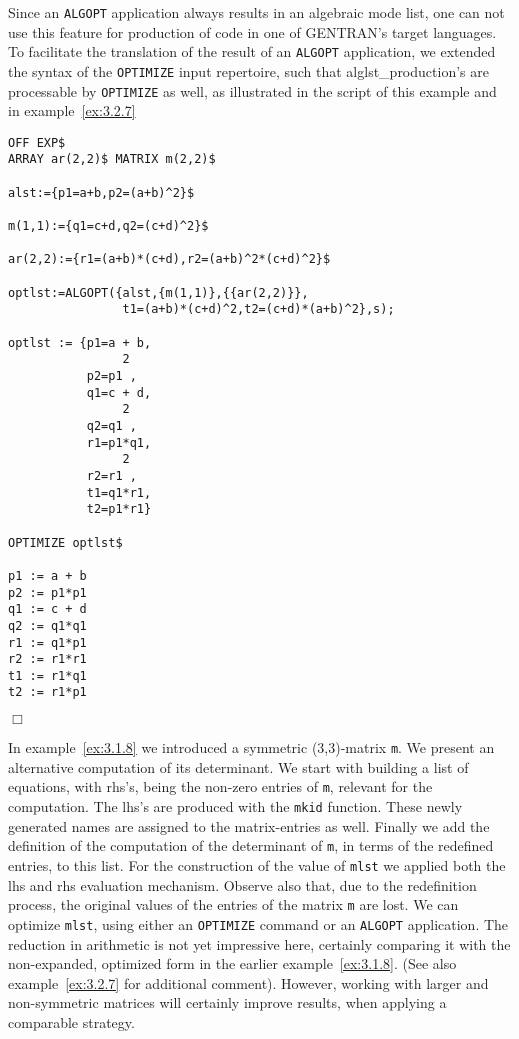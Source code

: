 Since an {\tt ALGOPT} application always results in an algebraic mode list,
one can not use this feature for production of code in one of GENTRAN's target
languages. To facilitate the translation of the result of an {\tt ALGOPT}
application, we extended the syntax of the {\tt OPTIMIZE} input repertoire,
such that alglst\_production's are processable by {\tt OPTIMIZE}
as well, as illustrated in the script of this example and
in example~\ref{ex:3.2.7}
{\small
\begin{verbatim}
OFF EXP$
ARRAY ar(2,2)$ MATRIX m(2,2)$

alst:={p1=a+b,p2=(a+b)^2}$

m(1,1):={q1=c+d,q2=(c+d)^2}$

ar(2,2):={r1=(a+b)*(c+d),r2=(a+b)^2*(c+d)^2}$

optlst:=ALGOPT({alst,{m(1,1)},{{ar(2,2)}},
                t1=(a+b)*(c+d)^2,t2=(c+d)*(a+b)^2},s);

optlst := {p1=a + b,
                2
           p2=p1 ,
           q1=c + d,
                2
           q2=q1 ,
           r1=p1*q1,
                2
           r2=r1 ,
           t1=q1*r1,
           t2=p1*r1}

OPTIMIZE optlst$

p1 := a + b
p2 := p1*p1
q1 := c + d
q2 := q1*q1
r1 := q1*p1
r2 := r1*r1
t1 := r1*q1
t2 := r1*p1
\end{verbatim}
\begin{flushright}
$\Box$
\end{flushright}}
\example\label{ex:3.2.5}

In example~\ref{ex:3.1.8} we introduced a symmetric (3,3)-matrix {\tt m}. We
present an alternative computation of its determinant. We start with building
a list of equations, with rhs's, being the non-zero entries of {\tt m},
relevant for the computation. The lhs's are produced with
the {\tt mkid} function. These
newly generated names are assigned to the matrix-entries as well. Finally
we add the definition of the computation of the determinant of {\tt m},
in terms of the redefined entries, to this list.
For the construction of the value of {\tt mlst} we applied both the lhs and
rhs evaluation mechanism. Observe also that, due to the redefinition process,
the original values of the entries of the matrix {\tt m} are lost.
We can optimize {\tt mlst}, using
either an {\tt OPTIMIZE} command or an {\tt ALGOPT} application. The reduction
in arithmetic is not yet impressive here, certainly comparing it with the
non-expanded, optimized form in the earlier example~\ref{ex:3.1.8}.
(See also example~\ref{ex:3.2.7} for additional comment).
However, working with larger and non-symmetric matrices will certainly
improve results, when applying a comparable strategy.

